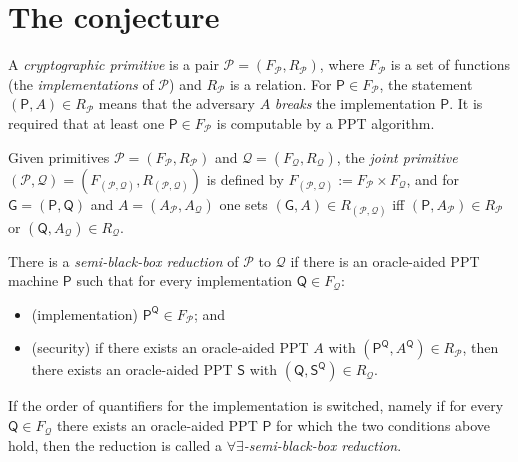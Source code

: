 \documentclass{aicr-conjecture}
\newcommand{\Zc}{\mathcal{Z}}
\newcommand{\Pc}{\mathcal{P}}
\newcommand{\Qc}{\mathcal{Q}}
\newcommand{\semibbu}{[\mathrm{semi}\to\forall\exists\text{-semi}]}
\newcommand{\Ps}{\mathsf{P}}
\newcommand{\Qs}{\mathsf{Q}}
\begin{document}
\section{The conjecture}\label{sec:conjectures}

\begin{definition}\label{def:prim}
A \emph{cryptographic primitive} is a pair $\Pc=(F_{\Pc},R_{\Pc})$, where
$F_{\Pc}$ is a set of functions (the \emph{implementations} of $\Pc$) and
$R_{\Pc}$ is a relation. For $\Ps\in F_{\Pc}$, the statement
$(\Ps,A)\in R_{\Pc}$ means that the adversary $A$ \emph{breaks} the
implementation $\Ps$. It is required that at least one $\Ps\in F_{\Pc}$
is computable by a PPT algorithm.
\end{definition}

\begin{definition}\label{def:joint}
Given primitives $\Pc=(F_{\Pc},R_{\Pc})$ and $\Qc=(F_{\Qc},R_{\Qc})$, the
\emph{joint primitive}
$(\Pc,\Qc)=(F_{(\Pc,\Qc)},R_{(\Pc,\Qc)})$ is defined by
$F_{(\Pc,\Qc)}:=F_{\Pc}\times F_{\Qc}$, and for $\mathsf G=(\Ps,\Qs)$ and
$A=(A_{\Pc},A_{\Qc})$ one sets $(\mathsf G,A)\in R_{(\Pc,\Qc)}$ iff
$(\Ps,A_{\Pc})\in R_{\Pc}$ or $(\Qs,A_{\Qc})\in R_{\Qc}$.
\end{definition}

\begin{definition}\label{def:semi}
There is a \emph{semi-black-box reduction} of $\Pc$ to $\Qc$ if there is
an oracle-aided PPT machine $\Ps$ such that for every implementation
$\Qs\in F_{\Qc}$:
\begin{itemize}
\item (implementation) $\Ps^{\Qs}\in F_{\Pc}$; and
\item (security) if there exists an oracle-aided PPT $A$ with
  $(\Ps^{\Qs},A^{\Qs})\in R_{\Pc}$, then there exists an oracle-aided PPT
  $\mathsf S$ with $(\Qs,\mathsf S^{\Qs})\in R_{\Qc}$.
\end{itemize}
If the order of quantifiers for the implementation is switched, namely if
for every $\Qs\in F_{\Qc}$ there exists an oracle-aided PPT $\Ps$ for
which the two conditions above hold, then the reduction is called a
\emph{$\forall\exists$-semi-black-box reduction}.
\end{definition}

\end{document}
